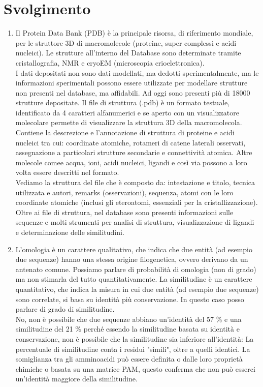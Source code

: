 \documentclass{article}
\begin{document}
\section*{Svolgimento}
\begin{enumerate}[1)]
   \item Il Protein Data Bank (PDB) è la principale risorsa, di riferimento mondiale, per le struttore 3D di macromolecole (proteine, super complessi e acidi nucleici). Le strutture all'interno del Database sono determinate tramite cristallografia, NMR e cryoEM (microscopia crioelettronica).\\
   I dati depositati non sono dati modellati, ma dedotti sperimentalmente, ma le informazioni sperimentali possono essere utilizzate per modellare strutture non presenti nel database, ma affidabili. Ad oggi sono presenti più di 18000 strutture depositate. Il file di struttura (.pdb) è un formato testuale, identificato da 4 caratteri alfanumerici e se aperto con un visualizzatore molecolare permette di visualizzare la struttura 3D della macromolecola. Contiene la descrezione e l'annotazione di struttura di proteine e acidi nucleici tra cui: coordinate atomiche, rotameri di catene laterali osservati, assegnazione a particolari strutture secondarie e connettività atomica. Altre molecole comee acqua, ioni, acidi nucleici, ligandi e così via possono a loro volta essere descritti nel formato.\\
   Vediamo la struttura del file che è composto da: intestazione e titolo, tecnica utilizzata e autori, remarks (osservazioni), sequenza, atomi con le loro coordinate atomiche (inclusi gli eteroatomi, essenziali per la cristallizzazione). Oltre ai file di struttura, nel database sono presenti informazioni sulle sequenze e molti strumenti per analisi di struttura, visualizzazione di ligandi e determinazione delle similitudini.
   \item L'omologia è un carattere qualitativo, che indica che due entità (ad esempio due sequenze) hanno una stessa origine filogenetica, ovvero derivano da un antenato comune. Possiamo parlare di probabilità di omologia (non di grado) ma non stimarla del tutto quantitativamente. La similitudine è un carattere quantitativo, che indica la misura in cui due entità (ad esempio due sequenze) sono correlate, si basa su identità più conservazione. In questo caso posso parlare di grado di similitudine.\\
   No, non è possibile che due sequenze abbiano un'identità del 57 \% e una similitudine del 21 \% perché essendo la similitudine basata su identità e conservazione, non è possibile che la similitudine sia inferiore all'identità: La percentuale di similitudine conta i residui "simili", oltre a quelli identici. La somiglianza tra gli amminoacidi può essere definita o dalle loro proprietà chimiche o basata su una matrice PAM, questo conferma che non può esserci un'identità maggiore della similitudine.

\end{enumerate}
\end{document}
